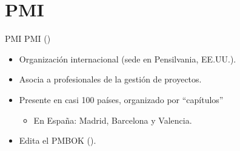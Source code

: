 \section{PMI}
\begin{frame}{PMI}
	PMI ()
	\begin{itemize}
		\item Organización internacional (sede en Pensilvania, EE.UU.).
		\item Asocia a profesionales de la gestión de proyectos.
		\item Presente en casi 100 países, organizado por ``capítulos''
		\begin{itemize}
			\item En España: Madrid, Barcelona y Valencia.
		\end{itemize}
		\item Edita el PMBOK ().
	\end{itemize}
\end{frame}

